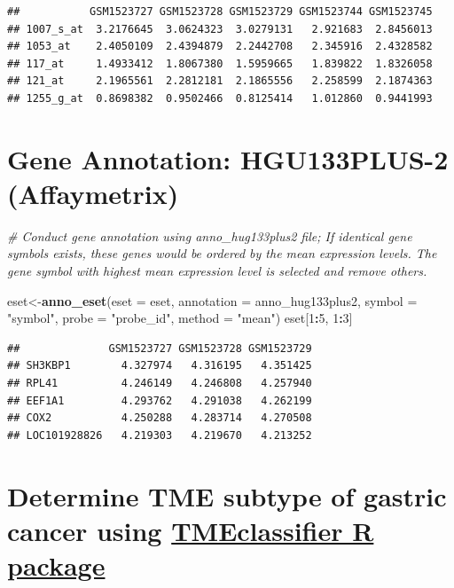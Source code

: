 \documentclass[
  12pt,
]{book}
\newenvironment{Shaded}{\begin{snugshade}}{\end{snugshade}}
\newcommand{\AttributeTok}[1]{\textcolor[rgb]{0.13,0.29,0.53}{#1}}
\newcommand{\CommentTok}[1]{\textcolor[rgb]{0.56,0.35,0.01}{\textit{#1}}}
\newcommand{\DecValTok}[1]{\textcolor[rgb]{0.00,0.00,0.81}{#1}}
\newcommand{\FunctionTok}[1]{\textcolor[rgb]{0.13,0.29,0.53}{\textbf{#1}}}
\newcommand{\NormalTok}[1]{#1}
\newcommand{\OtherTok}[1]{\textcolor[rgb]{0.56,0.35,0.01}{#1}}
\newcommand{\SpecialCharTok}[1]{\textcolor[rgb]{0.81,0.36,0.00}{\textbf{#1}}}
\newcommand{\StringTok}[1]{\textcolor[rgb]{0.31,0.60,0.02}{#1}}
\begin{document}
\begin{verbatim}
##           GSM1523727 GSM1523728 GSM1523729 GSM1523744 GSM1523745
## 1007_s_at  3.2176645  3.0624323  3.0279131   2.921683  2.8456013
## 1053_at    2.4050109  2.4394879  2.2442708   2.345916  2.4328582
## 117_at     1.4933412  1.8067380  1.5959665   1.839822  1.8326058
## 121_at     2.1965561  2.2812181  2.1865556   2.258599  2.1874363
## 1255_g_at  0.8698382  0.9502466  0.8125414   1.012860  0.9441993
\end{verbatim}

\hypertarget{gene-annotation-hgu133plus-2-affaymetrix-1}{%
\section{Gene Annotation: HGU133PLUS-2 (Affaymetrix)}\label{gene-annotation-hgu133plus-2-affaymetrix-1}}

\begin{Shaded}
\begin{Highlighting}[]
\CommentTok{\# Conduct gene annotation using \textasciigrave{}anno\_hug133plus2\textasciigrave{} file; If identical gene symbols exists, these genes would be ordered by the mean expression levels. The gene symbol with highest mean expression level is selected and remove others. }

\NormalTok{eset}\OtherTok{\textless{}{-}}\FunctionTok{anno\_eset}\NormalTok{(}\AttributeTok{eset       =}\NormalTok{ eset,}
                \AttributeTok{annotation =}\NormalTok{ anno\_hug133plus2,}
                \AttributeTok{symbol     =} \StringTok{"symbol"}\NormalTok{,}
                \AttributeTok{probe      =} \StringTok{"probe\_id"}\NormalTok{,}
                \AttributeTok{method     =} \StringTok{"mean"}\NormalTok{)}
\NormalTok{eset[}\DecValTok{1}\SpecialCharTok{:}\DecValTok{5}\NormalTok{, }\DecValTok{1}\SpecialCharTok{:}\DecValTok{3}\NormalTok{]}
\end{Highlighting}
\end{Shaded}

\begin{verbatim}
##              GSM1523727 GSM1523728 GSM1523729
## SH3KBP1        4.327974   4.316195   4.351425
## RPL41          4.246149   4.246808   4.257940
## EEF1A1         4.293762   4.291038   4.262199
## COX2           4.250288   4.283714   4.270508
## LOC101928826   4.219303   4.219670   4.213252
\end{verbatim}

\hypertarget{determine-tme-subtype-of-gastric-cancer-using-tmeclassifier-r-package}{%
\section{\texorpdfstring{Determine TME subtype of gastric cancer using \href{https://github.com/LiaoWJLab/TMEclassifier}{TMEclassifier R package}}{Determine TME subtype of gastric cancer using TMEclassifier R package}}\label{determine-tme-subtype-of-gastric-cancer-using-tmeclassifier-r-package}}
\end{document}
